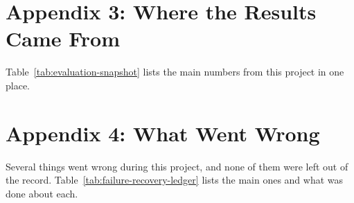 \section*{Appendix 3: Where the Results Came From}

Table~\ref{tab:evaluation-snapshot} lists the main numbers from this project in one place.



\section*{Appendix 4: What Went Wrong}

Several things went wrong during this project, and none of them were left out of the record. Table~\ref{tab:failure-recovery-ledger} lists the main ones and what was done about each.

